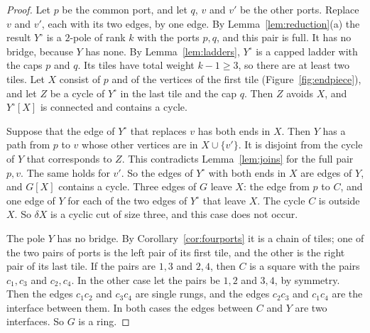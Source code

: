 \begin{proof}
 Let $p$ be the common port, and let $q$,
$v$ and $v'$ be the other ports. Replace $v$ and $v'$, each with its two edges, by one edge. By
Lemma~\ref{lem:reduction}(a) the result $Y^{\circ}$ is a $2$-pole of rank $k$ with the ports
$p,q$, and this pair is full. It has no bridge, because $Y$ has none. By
Lemma~\ref{lem:ladders}, $Y^{\circ}$ is a capped ladder with the caps $p$ and $q$. Its tiles
have total weight $k-1\ge3$, so there are at least two tiles. Let $X$ consist of $p$ and of the
vertices of the first tile (Figure~\ref{fig:endpiece}), and let $Z$ be a cycle of $Y^{\circ}$ in the last tile and the cap
$q$. Then $Z$ avoids $X$, and $Y^{\circ}[X]$ is connected and contains a cycle.

Suppose that the edge of $Y^{\circ}$ that replaces $v$ has both ends in $X$. Then $Y$ has a path
from $p$ to $v$ whose other vertices are in $X\cup\{v'\}$. It is disjoint from the cycle of $Y$
that corresponds to $Z$. This contradicts Lemma~\ref{lem:joins} for the full pair $p,v$. The
same holds for $v'$. So the edges of $Y^{\circ}$ with both ends in $X$ are edges of $Y$, and
$G[X]$ contains a cycle. Three edges of $G$ leave $X$: the edge from $p$ to $C$, and one edge of
$Y$ for each of the two edges of $Y^{\circ}$ that leave $X$. The cycle $C$ is outside $X$. So
$\delta X$ is a cyclic cut of size three, and this case does not occur.

 The pole $Y$ has no
bridge. By Corollary~\ref{cor:fourports} it is a chain of tiles; one of the two pairs of ports
is the left pair of its first tile, and the other is the right pair of its last tile. If the
pairs are $1,3$ and $2,4$, then $C$ is a square with the pairs $c_1,c_3$ and $c_2,c_4$. In the
other case let the pairs be $1,2$ and $3,4$, by symmetry. Then the edges $c_1c_2$ and $c_3c_4$
are single rungs, and the edges $c_2c_3$ and $c_1c_4$ are the interface between them. In both
cases the edges between $C$ and $Y$ are two interfaces. So $G$ is a ring.
\end{proof}
